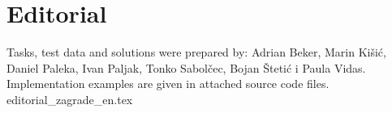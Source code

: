 \documentclass[a4paper]{article}
\date{October 3rd 2020.}
\begin{document}
\section*{Editorial}
Tasks, test data and solutions were prepared by:
Adrian Beker, Marin Kišić,
Daniel Paleka, Ivan Paljak, Tonko Sabolčec, Bojan Štetić i Paula Vidas.
Implementation examples are given in attached source code files.
\clearpage
\clearpage
\clearpage
{editorial_zagrade_en.tex}
\clearpage
\end{document}
